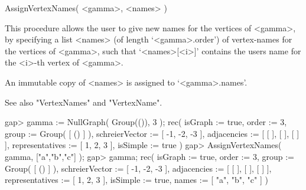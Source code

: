 \>AssignVertexNames( <gamma>, <names> )

This procedure allows the user to give new names for the vertices of
<gamma>, by specifying a list <names> (of length `<gamma>.order') of
vertex-names for the vertices of <gamma>, such that `<names>[<i>]'
contains the user{\pif}s name for the <i>-th vertex of <gamma>.

An immutable copy of <names> is assigned to `<gamma>.names'. 

See also "VertexNames" and "VertexName".

\beginexample
gap> gamma := NullGraph( Group(()), 3 );
rec(
  isGraph := true,
  order := 3,
  group := Group( [ () ] ),
  schreierVector := [ -1, -2, -3 ],
  adjacencies := [ [  ], [  ], [  ] ],
  representatives := [ 1, 2, 3 ],
  isSimple := true )
gap> AssignVertexNames( gamma, ["a","b","c"] );
gap> gamma;
rec(
  isGraph := true,
  order := 3,
  group := Group( [ () ] ),
  schreierVector := [ -1, -2, -3 ],
  adjacencies := [ [  ], [  ], [  ] ],
  representatives := [ 1, 2, 3 ],
  isSimple := true,
  names := [ "a", "b", "c" ] )
\endexample
